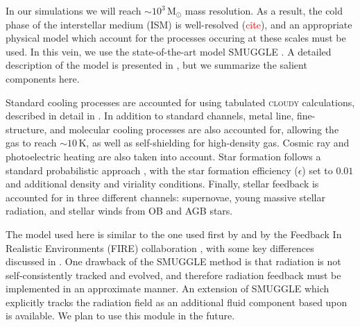 \documentclass[a4paper,fleqn,usenatbib]{mnras}
\newcommand{\Msun}{\ensuremath{\text{M}_{\odot}}}
\newcommand{\smuggle}{\textsc{SMUGGLE}}
\begin{document}
In our simulations we will reach $\sim10^3\,\Msun$ mass resolution. As a
result, the cold phase of the interstellar medium (ISM) is well-resolved
(\textcolor{red}{cite}), and an appropriate physical model which account for
the processes occuring at these scales must be used. In this vein, we use the
state-of-the-art model \smuggle{} \citep{2019MNRAS.489.4233M}. A detailed
description of the model is presented in \citet{2019MNRAS.489.4233M}, but we
summarize the salient components here.

Standard cooling processes are accounted for using tabulated \textsc{cloudy}
calculations, described in detail in \citet{2013MNRAS.436.3031V}. In addition
to standard channels, metal line, fine-structure, and molecular cooling
processes are also accounted for, allowing the gas to reach
$\sim10\,\text{K}$, as well as self-shielding for high-density gas. Cosmic ray
and photoelectric heating are also taken into account. Star formation follows
a standard probabilistic approach \citep{2003MNRAS.339..289S}, with the star
formation efficiency ($\epsilon$) set to $0.01$ and additional density and
viriality conditions. Finally, stellar feedback is accounted for in three
different channels: supernovae, young massive stellar radiation, and stellar
winds from OB and AGB stars.

The model used here is similar to the one used first by
\citet{2011MNRAS.410.1391A, 2013ApJ...770...25A} and by the Feedback In
Realistic Environments (FIRE) collaboration \citep{2011MNRAS.417..950H,
2014MNRAS.445..581H, 2018MNRAS.480..800H}, with some key differences discussed
in \citet{2019MNRAS.489.4233M}. One drawback of the \smuggle{} method is that
radiation is not self-consistently tracked and evolved, and therefore
radiation feedback must be implemented in an approximate manner. An extension
of \smuggle{} which explicitly tracks the radiation field as an additional
fluid component \citep{2019arXiv191014041K} based upon \areport{}
\citep{2019MNRAS.485..117K} is available. We plan to use this module in the
future.

\end{document}
